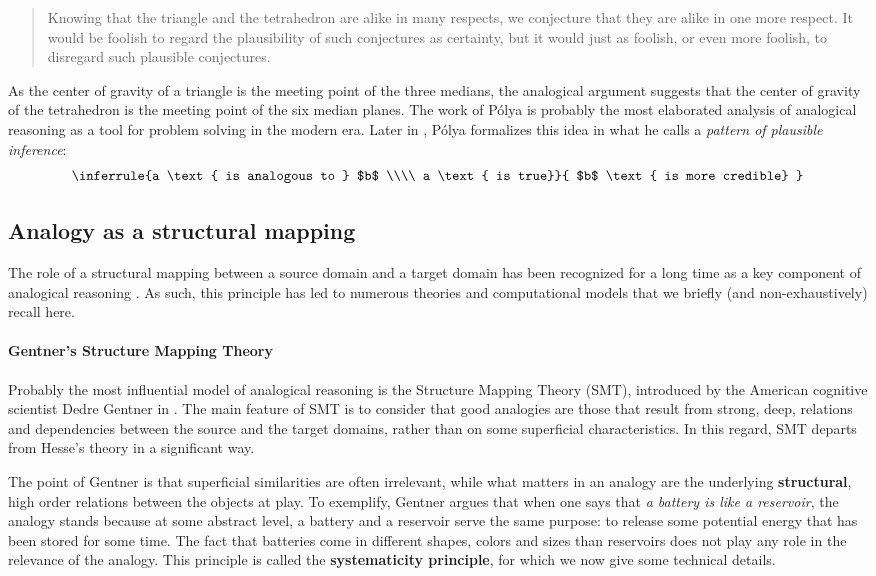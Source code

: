 \begin{quote}
Knowing that the triangle and the tetrahedron are alike in many respects, we
  conjecture that they are alike in one more respect. It would be foolish to
  regard the plausibility of such conjectures as certainty, but it would just
  as foolish, or even more foolish, to disregard such plausible conjectures.
\end{quote}

As the center of gravity of a triangle is the meeting point of the three
medians, the analogical argument suggests that the center of gravity of the
tetrahedron is the meeting point of the six median planes. The work of P\'olya
is probably the most elaborated analysis of analogical reasoning as a tool for
problem solving in the modern era. Later in \cite{Pol54}, P\'olya formalizes
this idea in what he calls a \textit{pattern of plausible inference}:
$$
\inferrule{a \text{ is analogous to } $b$ \\\\ a \text{ is true}}{ $b$ \text{
  is more credible} }
$$
\subsection{Analogy as a structural mapping}

The role of a structural mapping between a source domain and a target domain
has been recognized for a long time as a key component of analogical reasoning
\cite{Pol54}. As such, this principle has led to numerous theories and
computational models that we briefly (and non-exhaustively) recall here.

\paragraph{Gentner's Structure Mapping Theory\\}

Probably the most influential model of analogical reasoning is the Structure
Mapping Theory (SMT), introduced by the American cognitive scientist Dedre
Gentner in \cite{Gen83}. The main feature of SMT is to consider that good
analogies are those that result from strong, deep, relations and dependencies
between the source and the target domains, rather than on some superficial
characteristics. In this regard, SMT departs from Hesse's theory in a
significant way. 

The point of Gentner is that superficial similarities are often irrelevant,
while what matters in an analogy are the underlying \textbf{structural}, high
order relations between the objects at play. To exemplify, Gentner argues that
when one says that \textit{a battery is like a reservoir}, the analogy stands
because at some abstract level, a battery and a reservoir serve the same
purpose: to release some potential energy that has been stored for some time.
The fact that batteries come in different shapes, colors and sizes than
reservoirs does not play any role in the relevance of the analogy. This
principle is called the \textbf{systematicity principle}, for which we now give
some technical details.

